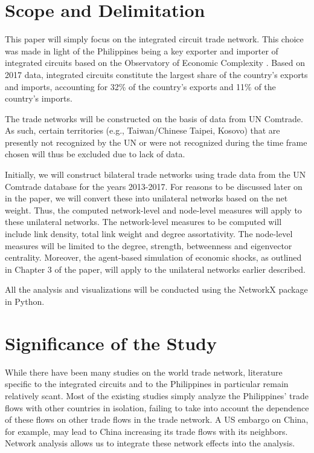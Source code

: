 \documentclass[12pt,letterpaper]{report}
\begin{document}
\section{Scope and Delimitation}
\label{sec:13Scope}
	
	This paper will simply focus on the integrated circuit trade network. This choice was made in light of the Philippines being a key exporter and importer of integrated circuits based on the Observatory of Economic Complexity \cite{simoes2011economic}. Based on 2017 data, integrated circuits constitute the largest share of the country's exports and imports, accounting for 32\% of the country's exports and 11\% of the country's imports. 
	
	The trade networks will be constructed on the basis of data from UN Comtrade. As such, certain territories (e.g., Taiwan/Chinese Taipei, Kosovo) that are presently not recognized by the UN or were not recognized during the time frame chosen will thus be excluded due to lack of data. 
	
	Initially, we will construct bilateral trade networks using trade data from the UN Comtrade database for the years 2013-2017. For reasons to be discussed later on in the paper, we will convert these into unilateral networks based on the net weight. Thus, the computed network-level and node-level measures will apply to these unilateral networks. The network-level measures to be computed will include link density, total link weight and degree assortativity. The node-level measures will be limited to the degree, strength, betweenness and eigenvector centrality. Moreover, the agent-based simulation of economic shocks, as outlined in Chapter 3 of the paper, will apply to the unilateral networks earlier described. 
	
	All the analysis and visualizations will be conducted using the NetworkX package in Python.
	
\section{Significance of the Study}
\label{sec:14Significance}
	
	While there have been many studies on the world trade network, literature specific to the integrated circuits and to the Philippines in particular remain relatively scant. Most of the existing studies simply analyze the Philippines' trade flows with other countries in isolation, failing to take into account the dependence of these flows on other trade flows in the trade network. A US embargo on China, for example, may lead to China increasing its trade flows with its neighbors. Network analysis allows us to integrate these network effects into the analysis.
	
\end{document}
